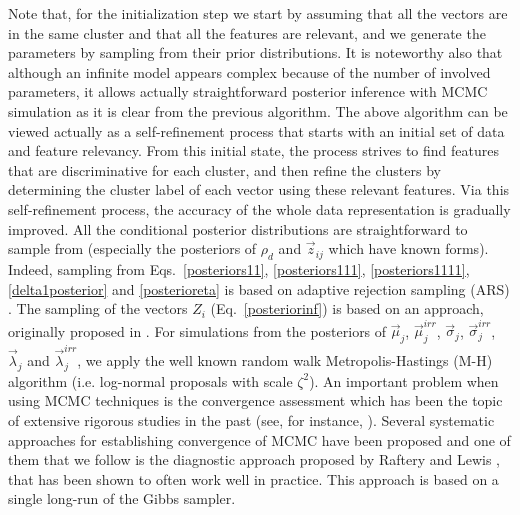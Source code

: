\documentclass[journal,10pt]{elsart}
\begin{document}
Note that, for the initialization step we start by assuming that all the vectors are in the same cluster and that all the features are relevant, and we generate the parameters by sampling from their prior distributions. It is noteworthy also that although an infinite model appears complex because of the number of involved parameters, it allows actually straightforward posterior inference with MCMC simulation as it is clear from the previous algorithm. The above algorithm can be viewed actually as a self-refinement process that starts with an initial set of data and feature relevancy. From this initial state, the process strives to find features that are discriminative for each cluster, and then refine the clusters by determining the cluster label of each vector using these relevant features. Via this self-refinement process, the accuracy of the whole data representation is gradually improved. All the conditional posterior distributions are straightforward to sample from (especially the posteriors of $\rho_d$ and $\vec{z}_{ij}$ which have known forms). Indeed, sampling from Eqs.~\ref{posteriors11}, \ref{posteriors111}, \ref{posteriors1111}, \ref{delta1posterior} and \ref{posterioreta} is based on adaptive rejection sampling (ARS) \cite{Gilks1993}. The sampling of the vectors $Z_i$ (Eq.~\ref{posteriorinf}) is based on an approach, originally proposed in \cite{Neal2000}. For simulations from the posteriors of $\vec{\mu}_{j}$, $\vec{\mu}_{j}^{irr}$, $\vec{\sigma}_j$, $\vec{\sigma}_j^{irr}$, $\vec{\lambda}_j$ and $\vec{\lambda}_j^{irr}$, we apply the well known random walk Metropolis-Hastings (M-H) algorithm (i.e. log-normal proposals with scale $\zeta^{2}$). An important problem when using MCMC techniques is the convergence assessment which has been the topic of extensive rigorous studies in the past (see, for instance, \cite{Rosenthal1995,Mengersen1996,RobertsO1999}). Several systematic approaches for establishing convergence of MCMC have been proposed and one of them that we follow is the diagnostic approach proposed by Raftery and Lewis \cite{Raftery1992,Lewis1996}, that has been shown to often work well in practice. This approach is based on a single long-run of the Gibbs sampler.
\end{document}

